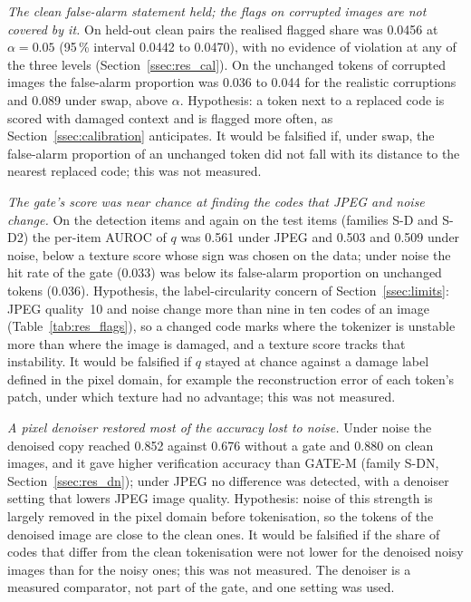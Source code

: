 \emph{The clean false-alarm statement held; the flags on corrupted images are not covered by it.}
On held-out clean pairs the realised flagged share was 0.0456 at $\alpha=0.05$ (95\,\% interval 0.0442 to 0.0470), with no evidence
of violation at any of the three levels (Section~\ref{ssec:res_cal}).
On the unchanged tokens of corrupted images the false-alarm proportion was 0.036 to 0.044 for the realistic corruptions and 0.089 under
swap, above $\alpha$.
Hypothesis: a token next to a replaced code is scored with damaged context and is flagged more often, as Section~\ref{ssec:calibration}
anticipates.
It would be falsified if, under swap, the false-alarm proportion of an unchanged token did not fall with its distance to the nearest
replaced code; this was not measured.

\emph{The gate's score was near chance at finding the codes that JPEG and noise change.}
On the detection items and again on the test items (families S-D and S-D2) the per-item AUROC of $q$ was 0.561 under JPEG and 0.503 and
0.509 under noise, below a texture score whose sign was chosen on the data; under noise the hit rate of the gate (0.033) was below its
false-alarm proportion on unchanged tokens (0.036).
Hypothesis, the label-circularity concern of Section~\ref{ssec:limits}: JPEG quality~10 and noise change more than nine in ten codes of
an image (Table~\ref{tab:res_flags}), so a changed code marks where the tokenizer is unstable more than where the image is damaged, and a
texture score tracks that instability.
It would be falsified if $q$ stayed at chance against a damage label defined in the pixel domain, for example the reconstruction error
of each token's patch, under which texture had no advantage; this was not measured.

\emph{A pixel denoiser restored most of the accuracy lost to noise.}
Under noise the denoised copy reached 0.852 against 0.676 without a gate and 0.880 on clean images, and it gave higher verification
accuracy than GATE-M (family S-DN, Section~\ref{ssec:res_dn}); under JPEG no difference was detected, with a denoiser setting that
lowers JPEG image quality.
Hypothesis: noise of this strength is largely removed in the pixel domain before tokenisation, so the tokens of the denoised image are
close to the clean ones.
It would be falsified if the share of codes that differ from the clean tokenisation were not lower for the denoised noisy images than for
the noisy ones; this was not measured.
The denoiser is a measured comparator, not part of the gate, and one setting was used.

